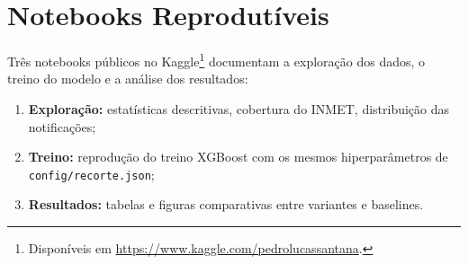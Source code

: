 \section{Notebooks Reprodutíveis}

Três notebooks públicos no Kaggle\footnote{Disponíveis em \url{https://www.kaggle.com/pedrolucassantana}.} documentam a exploração dos dados, o treino do modelo e a análise dos resultados:

\begin{enumerate}
    \item \textbf{Exploração:} estatísticas descritivas, cobertura do INMET, distribuição das notificações;
    \item \textbf{Treino:} reprodução do treino XGBoost com os mesmos hiperparâmetros de \texttt{config/recorte.json};
    \item \textbf{Resultados:} tabelas e figuras comparativas entre variantes e baselines.
\end{enumerate}
